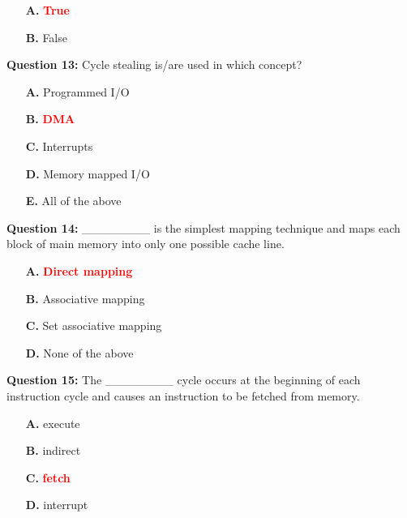 \documentclass[12pt,a4paper]{article}
\begin{document}
\begin{itemize}
    \item[\textbf{A.}] \textcolor{red}{\textbf{True}}
    \item[\textbf{B.}] False
\end{itemize}

\vspace{0.5cm}

\textbf{Question 13:} Cycle stealing is/are used in which concept?

\begin{itemize}
    \item[\textbf{A.}] Programmed I/O
    \item[\textbf{B.}] \textcolor{red}{\textbf{DMA}}
    \item[\textbf{C.}] Interrupts
    \item[\textbf{D.}] Memory mapped I/O
    \item[\textbf{E.}] All of the above
\end{itemize}

\vspace{0.5cm}

\textbf{Question 14:} ________ is the simplest mapping technique and maps each block of main memory into only one possible cache line.

\begin{itemize}
    \item[\textbf{A.}] \textcolor{red}{\textbf{Direct mapping}}
    \item[\textbf{B.}] Associative mapping
    \item[\textbf{C.}] Set associative mapping
    \item[\textbf{D.}] None of the above
\end{itemize}

\vspace{0.5cm}

\textbf{Question 15:} The ________ cycle occurs at the beginning of each instruction cycle and causes an instruction to be fetched from memory.

\begin{itemize}
    \item[\textbf{A.}] execute
    \item[\textbf{B.}] indirect
    \item[\textbf{C.}] \textcolor{red}{\textbf{fetch}}
    \item[\textbf{D.}] interrupt
\end{itemize}

\vspace{0.5cm}
\end{document}
